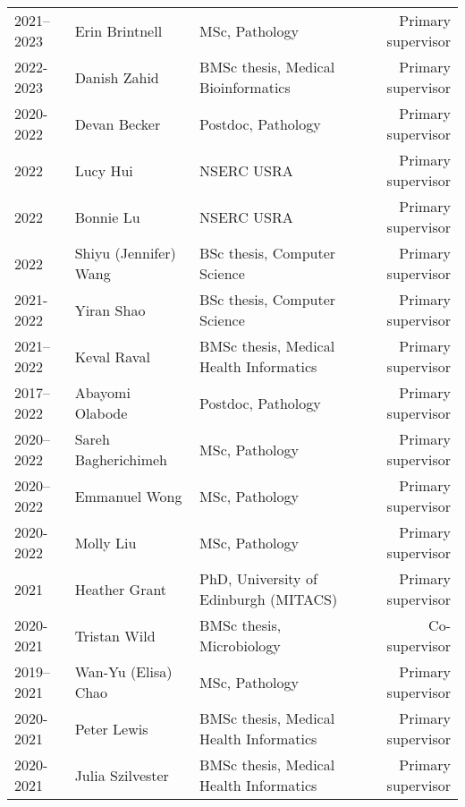 \begin{tabular}{llp{2.5in}r}
2021--2023 & Erin Brintnell & MSc, Pathology & Primary supervisor\\

2022-2023 & Danish Zahid & BMSc thesis, Medical Bioinformatics & Primary supervisor\\

2020-2022 & Devan Becker & Postdoc, Pathology & Primary supervisor\\

2022 & Lucy Hui & NSERC USRA & Primary supervisor\\

2022 & Bonnie Lu & NSERC USRA & Primary supervisor\\

2022 & Shiyu (Jennifer) Wang & BSc thesis, Computer Science & Primary supervisor\\

2021-2022 & Yiran Shao & BSc thesis, Computer Science & Primary supervisor\\


2021--2022 & Keval Raval & BMSc thesis, Medical Health Informatics & Primary supervisor\\

2017--2022 & Abayomi Olabode & Postdoc, Pathology & Primary supervisor\\

2020--2022 & Sareh Bagherichimeh & MSc, Pathology & Primary supervisor\\

2020--2022 & Emmanuel Wong & MSc, Pathology & Primary supervisor\\
2020-2022 & Molly Liu & MSc, Pathology & Primary supervisor\\

2021 & Heather Grant & PhD, University of Edinburgh (MITACS) & Primary supervisor\\

2020-2021 & Tristan Wild & BMSc thesis, Microbiology & Co-supervisor\\

2019--2021 & Wan-Yu (Elisa) Chao & MSc, Pathology & Primary supervisor\\



2020-2021 & Peter Lewis & BMSc thesis, Medical Health Informatics & Primary supervisor\\
2020-2021 & Julia Szilvester & BMSc thesis, Medical Health Informatics & Primary supervisor\\


\end{tabular}
